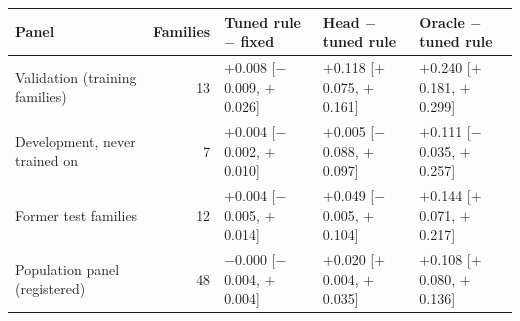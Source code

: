 \begin{tabular}{lrlll}
\toprule
Panel & Families & Tuned rule $-$ fixed & Head $-$ tuned rule & Oracle $-$ tuned rule \\
\midrule
Validation (training families) & 13 & $+$0.008 [$-$0.009, $+$0.026] & $+$0.118 [$+$0.075, $+$0.161] & $+$0.240 [$+$0.181, $+$0.299] \\
Development, never trained on & 7 & $+$0.004 [$-$0.002, $+$0.010] & $+$0.005 [$-$0.088, $+$0.097] & $+$0.111 [$-$0.035, $+$0.257] \\
Former test families & 12 & $+$0.004 [$-$0.005, $+$0.014] & $+$0.049 [$-$0.005, $+$0.104] & $+$0.144 [$+$0.071, $+$0.217] \\
Population panel (registered) & 48 & $-$0.000 [$-$0.004, $+$0.004] & $+$0.020 [$+$0.004, $+$0.035] & $+$0.108 [$+$0.080, $+$0.136] \\
\bottomrule
\end{tabular}
